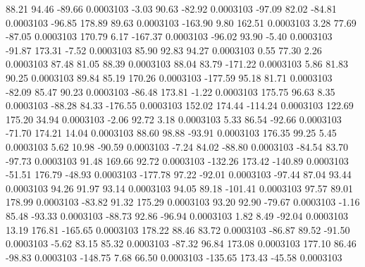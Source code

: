        88.21       94.46      -89.66     0.0003103
       -3.03       90.63      -82.92     0.0003103
      -97.09       82.02      -84.81     0.0003103
      -96.85      178.89       89.63     0.0003103
     -163.90        9.80      162.51     0.0003103
        3.28       77.69      -87.05     0.0003103
      170.79        6.17     -167.37     0.0003103
      -96.02       93.90       -5.40     0.0003103
      -91.87      173.31       -7.52     0.0003103
       85.90       92.83       94.27     0.0003103
        0.55       77.30        2.26     0.0003103
       87.48       81.05       88.39     0.0003103
       88.04       83.79     -171.22     0.0003103
        5.86       81.83       90.25     0.0003103
       89.84       85.19      170.26     0.0003103
     -177.59       95.18       81.71     0.0003103
      -82.09       85.47       90.23     0.0003103
      -86.48      173.81       -1.22     0.0003103
      175.75       96.63        8.35     0.0003103
      -88.28       84.33     -176.55     0.0003103
      152.02      174.44     -114.24     0.0003103
      122.69      175.20       34.94     0.0003103
       -2.06       92.72        3.18     0.0003103
        5.33       86.54      -92.66     0.0003103
      -71.70      174.21       14.04     0.0003103
       88.60       98.88      -93.91     0.0003103
      176.35       99.25        5.45     0.0003103
        5.62       10.98      -90.59     0.0003103
       -7.24       84.02      -88.80     0.0003103
      -84.54       83.70      -97.73     0.0003103
       91.48      169.66       92.72     0.0003103
     -132.26      173.42     -140.89     0.0003103
      -51.51      176.79      -48.93     0.0003103
     -177.78       97.22      -92.01     0.0003103
      -97.44       87.04       93.44     0.0003103
       94.26       91.97       93.14     0.0003103
       94.05       89.18     -101.41     0.0003103
       97.57       89.01      178.99     0.0003103
      -83.82       91.32      175.29     0.0003103
       93.20       92.90      -79.67     0.0003103
       -1.16       85.48      -93.33     0.0003103
      -88.73       92.86      -96.94     0.0003103
        1.82        8.49      -92.04     0.0003103
       13.19      176.81     -165.65     0.0003103
      178.22       88.46       83.72     0.0003103
      -86.87       89.52      -91.50     0.0003103
       -5.62       83.15       85.32     0.0003103
      -87.32       96.84      173.08     0.0003103
      177.10       86.46      -98.83     0.0003103
     -148.75        7.68       66.50     0.0003103
     -135.65      173.43      -45.58     0.0003103
